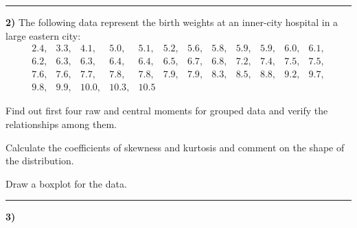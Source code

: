 \documentclass[11pt,a4paper]{article}
\begin{document}
\medskip\rule{\linewidth}{0.2pt}\medskip




\noindent   \textbf{2)} The following data represent the birth weights at an inner-city hospital in a large eastern city:
\[

\begin{array}{cccccccccccc}
2.4, & 3.3, & 4.1, & 5.0, & 5.1, & 5.2, & 5.6, & 5.8, & 5.9, & 5.9, & 6.0, & 6.1, \\
6.2, & 6.3, & 6.3, & 6.4, & 6.4, & 6.5, & 6.7, & 6.8, & 7.2, & 7.4, & 7.5, & 7.5, \\
7.6, & 7.6, & 7.7, & 7.8, & 7.8, & 7.9, & 7.9, & 8.3, & 8.5, & 8.8, & 9.2, & 9.7, \\
9.8, & 9.9, & 10.0, & 10.3, & 10.5
\end{array}
\]


\begin{parts}
  \item Find out first four raw and central moments for grouped data and verify the relationships among them.
  \item Calculate the coefficients of skewness and kurtosis and comment on the shape of the distribution.
  \item Draw a boxplot for the data.
\end{parts}

\medskip\rule{\linewidth}{0.2pt}\medskip




\noindent   \textbf{3)} 
\end{document}
